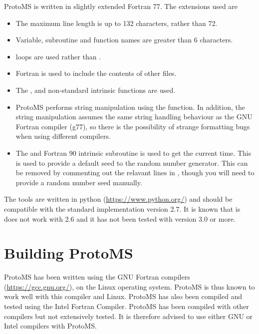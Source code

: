 \documentclass[letterpaper,10pt,english]{manual}
\begin{document}
ProtoMS is written in slightly extended Fortran 77. The extensions used are
\begin{itemize}
\item {} 
The maximum line length is up to 132 characters, rather than 72.

\item {} 
Variable, subroutine and function names are greater than 6 characters.

\item {} 
 loops are used rather than .

\item {} 
Fortran  is used to include the contents of other files.

\item {} 
The ,  and  non-standard intrinsic functions are used.

\item {} 
ProtoMS performs string manipulation using the  function. In addition, the string manipulation assumes the same string handling behaviour as the GNU Fortran compiler (g77), so there is the possibility of strange formatting bugs when using different compilers.

\item {} 
The  and  Fortran 90 intrinsic subroutine is used to get the current time. This is used to provide a default seed to the random number generator. This can be removed by commenting out the relavant lines in , though you will need to provide a random number seed manually.

\end{itemize}

The tools are written in python (\href{https://www.python.org/}{https://www.python.org/}) and should be compatible with the standard implementation version 2.7. It is known that is does not work with 2.6 and it has not been tested with version 3.0 or more.


\section{Building ProtoMS}

ProtoMS has been written using the GNU Fortran compilers (\href{https://gcc.gnu.org/}{https://gcc.gnu.org/}), on the Linux operating system. ProtoMS is thus known to work well with this compiler and Linux. ProtoMS has also been compiled and tested using the Intel Fortran Compiler. ProtoMS has been compiled with other compilers but not extensively tested. It is therefore advised to use either GNU or Intel compilers with ProtoMS.
\end{document}
